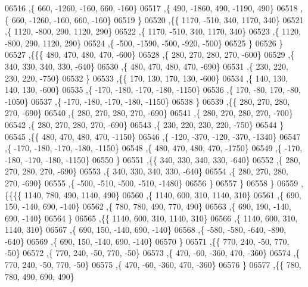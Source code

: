 \begin{DoxyCode}
06516     ,\{   660, -1260,  -160,   660,  -160\}
06517     ,\{   490, -1860,   490, -1190,   490\}
06518     ,\{   660, -1260,  -160,   660,  -160\}
06519     \}
06520    ,\{\{  1170,  -510,   340,  1170,   340\}
06521     ,\{  1120,  -800,   290,  1120,   290\}
06522     ,\{  1170,  -510,   340,  1170,   340\}
06523     ,\{  1120,  -800,   290,  1120,   290\}
06524     ,\{  -500, -1590,  -500,  -920,  -500\}
06525     \}
06526    \}
06527   ,\{\{\{   480,   470,   480,   470,  -600\}
06528     ,\{   280,   270,   280,   270,  -600\}
06529     ,\{   340,   330,   340,   330,  -640\}
06530     ,\{   480,   470,   480,   470,  -690\}
06531     ,\{   230,   220,   230,   220,  -750\}
06532     \}
06533    ,\{\{   170,   130,   170,   130,  -600\}
06534     ,\{   140,   130,   140,   130,  -600\}
06535     ,\{  -170,  -180,  -170,  -180, -1150\}
06536     ,\{   170,   -80,   170,   -80, -1050\}
06537     ,\{  -170,  -180,  -170,  -180, -1150\}
06538     \}
06539    ,\{\{   280,   270,   280,   270,  -690\}
06540     ,\{   280,   270,   280,   270,  -690\}
06541     ,\{   280,   270,   280,   270,  -700\}
06542     ,\{   280,   270,   280,   270,  -690\}
06543     ,\{   230,   220,   230,   220,  -750\}
06544     \}
06545    ,\{\{   480,   470,   480,   470, -1150\}
06546     ,\{  -120,  -370,  -120,  -370, -1340\}
06547     ,\{  -170,  -180,  -170,  -180, -1150\}
06548     ,\{   480,   470,   480,   470, -1750\}
06549     ,\{  -170,  -180,  -170,  -180, -1150\}
06550     \}
06551    ,\{\{   340,   330,   340,   330,  -640\}
06552     ,\{   280,   270,   280,   270,  -690\}
06553     ,\{   340,   330,   340,   330,  -640\}
06554     ,\{   280,   270,   280,   270,  -690\}
06555     ,\{  -500,  -510,  -500,  -510, -1480\}
06556     \}
06557    \}
06558   \}
06559  ,\{\{\{\{  1140,   780,   490,  1140,   490\}
06560     ,\{  1140,   600,   310,  1140,   310\}
06561     ,\{   690,   150,  -140,   690,  -140\}
06562     ,\{   780,   780,   490,   770,   490\}
06563     ,\{   690,   190,  -140,   690,  -140\}
06564     \}
06565    ,\{\{  1140,   600,   310,  1140,   310\}
06566     ,\{  1140,   600,   310,  1140,   310\}
06567     ,\{   690,   150,  -140,   690,  -140\}
06568     ,\{  -580,  -580,  -640,  -890,  -640\}
06569     ,\{   690,   150,  -140,   690,  -140\}
06570     \}
06571    ,\{\{   770,   240,   -50,   770,   -50\}
06572     ,\{   770,   240,   -50,   770,   -50\}
06573     ,\{   470,   -60,  -360,   470,  -360\}
06574     ,\{   770,   240,   -50,   770,   -50\}
06575     ,\{   470,   -60,  -360,   470,  -360\}
06576     \}
06577    ,\{\{   780,   780,   490,   690,   490\}

\end{DoxyCode}
